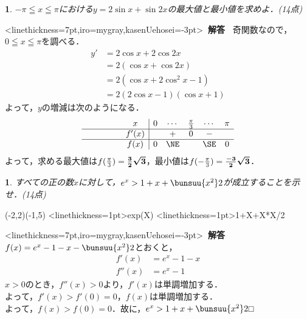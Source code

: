 \documentclass[9pt,
b4paper,
fleqn,
dvipdfmx,
uplatex
]{jsarticle}
\newtheorem{question}[Question]{}
\newcommand{\bqu}{\begin{question}}
\newcommand{\equ}{\end{question}}
\newcommand{\bb}{\bf\boldmath}%
\newcommand{\sq}{\textstyle\sqrt}
\newenvironment{解答}{
\hspace{-2zw}\phkasen<linethickness=7pt,iro=mygray,kasenUehosei=-3pt>{\bf \large \ 解答\ }\vspace{-1zw}\begin{leftbbar}}{\end{leftbbar}}
\newenvironment{leftbbar}{%
\def\FrameCommand{\color{mygray} \vrule width 5pt \hspace{1zw}
\color{black}}%
\MakeFramed {\advance\hsize-\width \FrameRestore}}%
{\endMakeFramed}
\begin{document}
\vfill

\bqu%
$-\pi \leqq x \leqq \pi$における$y=2\sin x+\sin2x$の最大値と最小値を求めよ．\hfill (14点)
\equ

\ifkaitou
\begin{解答}
奇関数なので，$0\leqq x \leqq \pi$を調べる．
\begin{align*}
y'&=2\cos x+2\cos2x\\
&=2(\cos x+\cos2x)\\
&=2(\cos x+2\cos^2x-1)\\
&=2(2\cos x-1)(\cos x+1)
\end{align*}
よって，$y$の増減は次のようになる．
\[\begin{array}{c|ccccccc}
\phantom{\bunsuu 11} x	&0	 	&\cdots	&\frac {\pi}3 		&\cdots	 	&\pi \\\hline
\phantom{\bunsuu 11}f'(x)	&		&+		&0		&-			&\\\hline
\phantom{\bunsuu 11}f(x)	&0		&\NE	&		&\SE		&0\\
\end{array}
\]
よって，求める最大値は$f(\frac{\pi}3)=\text{\bb $\frac 32 \sq 3$}$，最小値は$f(-\frac{\pi}3)=\text{\bb $\frac {-3}2 \sq 3$}$．
\end{解答}
\fi

\vfill

\bqu%
すべての正の数$x$に対して，$e^x > 1+x+\bunsuu{x^2}2$が成立することを示せ．\hfill (14点)
\equ

\ifkaitou
\begin{mawarikomi}{}{
\begin{zahyou}[ul=5mm](-2,2)(-1,5)
\def\Fx{exp(X)}
\def\Gx{1+X+X*X/2}
\YGraph<linethickness=1pt>\Fx
\YGraph<linethickness=1pt>\Gx
\end{zahyou}
}
\begin{解答}
$f(x)=e^x -1-x-\bunsuu{x^2}2$とおくと，
\begin{align*}
f'(x)&=e^x - 1-x\\
f''(x)&=e^x - 1
\end{align*}
$x>0$のとき，$f''(x)>0$より，$f'(x)$は単調増加する．\\
よって，$f'(x)>f'(0)=0$，$f(x)$は単調増加する．\\
よって，$f(x)>f(0)=0$．故に，$e^x > 1+x+\bunsuu{x^2}2$\hfill □
\end{解答}
\end{mawarikomi}
\fi
\end{document}
